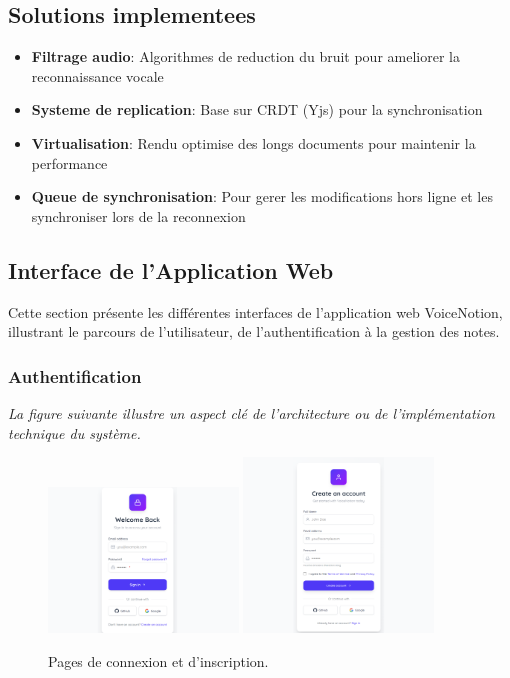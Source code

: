 \subsection{Solutions implementees}
\begin{itemize}
    \item \textbf{Filtrage audio}: Algorithmes de reduction du bruit pour ameliorer la reconnaissance vocale
    \item \textbf{Systeme de replication}: Base sur CRDT (Yjs) pour la synchronisation
    \item \textbf{Virtualisation}: Rendu optimise des longs documents pour maintenir la performance
    \item \textbf{Queue de synchronisation}: Pour gerer les modifications hors ligne et les synchroniser lors de la reconnexion
\end{itemize}

\subsection{Interface de l'Application Web}
Cette section présente les différentes interfaces de l'application web VoiceNotion, illustrant le parcours de l'utilisateur, de l'authentification à la gestion des notes.

\subsubsection{Authentification}
\noindent
\textit{La figure suivante illustre un aspect clé de l'architecture ou de l'implémentation technique du système.}
\begin{figure}[H]
    \centering
    \includegraphics[width=0.45\textwidth]{assets/docs/web/login-page.png}
    \hfill
    \includegraphics[width=0.45\textwidth]{assets/docs/web/singup.png}
    \caption{Pages de connexion et d'inscription.}
    \label{fig:web-auth}
\end{figure}

